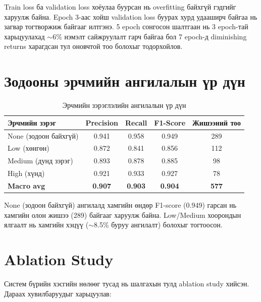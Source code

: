 Train loss ба validation loss хоёулаа буурсан нь overfitting байхгүй гэдгийг харуулж байна. Epoch 3-аас хойш validation loss буурах хурд удааширч байгаа нь загвар тогтворжиж байгааг илтгэнэ. 5 epoch сонгосон шалтгаан нь 3 epoch-тай харьцуулахад $\sim$6\% нэмэлт сайжруулалт гарч байгаа бол 7 epoch-д diminishing returns харагдсан тул оновчтой тоо болохыг тодорхойлов.

\section{Зодооны эрчмийн ангилалын үр дүн}

\begin{table}[h]
\centering
\caption{Эрчмийн зэрэглэлийн ангилалын үр дүн}
\label{tab:intensity_results}
\begin{tabular}{lcccc}
\hline
\textbf{Эрчмийн зэрэг} & \textbf{Precision} & \textbf{Recall} & \textbf{F1-Score} & \textbf{Жишээний тоо} \\
\hline
None (зодоон байхгүй) & 0.941 & 0.958 & 0.949 & 289 \\
Low (хөнгөн)          & 0.872 & 0.841 & 0.856 & 112 \\
Medium (дунд зэрэг)   & 0.893 & 0.878 & 0.885 &  98 \\
High (хүнд)           & 0.921 & 0.933 & 0.927 &  78 \\
\hline
\textbf{Macro avg}    & \textbf{0.907} & \textbf{0.903} & \textbf{0.904} & \textbf{577} \\
\hline
\end{tabular}
\end{table}

None (зодоон байхгүй) ангилалд хамгийн өндөр F1-score (0.949) гарсан нь хамгийн олон жишээ (289) байгааг харуулж байна. Low/Medium хоорондын ялгаалт нь хамгийн хэцүү ($\sim$8.5\% буруу ангилалт) болохыг тогтоосон.

\section{Ablation Study}

Систем бүрийн хэсгийн нөлөөг тусад нь шалгахын тулд ablation study хийсэн. Дараах хувилбаруудыг харьцуулав:

